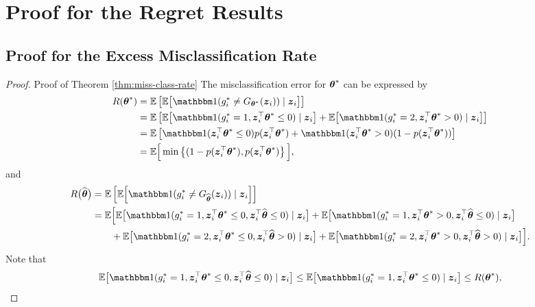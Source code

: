 

\section{Proof for the Regret Results}
\label{sec:proof-regret}

\subsection{Proof for the Excess Misclassification Rate}\label{sec:proof-misclustering}

\begin{proof}{Proof of Theorem \ref{thm:miss-class-rate}}
The misclassification error for $\boldsymbol{\theta}^*$ can be expressed by
\begin{align*}
	R(\btheta^*) & = \EE\brackets{\EE\big[\bbone(g_i^* \neq G_{\btheta^*}(\bz_i)) \cond \bz_i\big]} \\
	&=\EE\brackets{\EE\big[\bbone(g_i^* =1, \bz_i^{\top}\btheta^*\leq0) \cond \bz_i\big]+\EE\big[\bbone(g_i^* =2, \bz_i^{\top}\btheta^*>0) \cond \bz_i\big]} \\
	&=\EE\brackets{\bbone(\bz_i^{\top}\btheta^* \leq 0)p(\bz_i^{\top}\btheta^*)+\bbone(\bz_i^{\top}\btheta^* > 0)(1-p(\bz_i^{\top}\btheta^*))} \\
	& = \EE \Big[\min\braces{(1 - p(\bz_i^\top\btheta^*), p(\bz_i^\top\btheta^*)}\Big],
\end{align*}
and 
\begin{align*}
	R\big(\hat\btheta\big) & = \EE\brackets{\EE\Big[\bbone(g_i^* \neq G_{\hat\btheta}(\bz_i)) \cond \bz_i\Big]}\\
	&=\EE\Big[\EE\big[\bbone(g_i^* =1, \bz_i^{\top}\btheta^*\leq0, \bz_i^{\top}\hat{\btheta} \leq 0) \cond \bz_i\big]+\EE\big[\bbone(g_i^* =1, \bz_i^{\top}\btheta^*>0, \bz_i^{\top}\hat{\btheta} \leq 0) \cond \bz_i\big]\\
	&\quad\quad +\EE\big[\bbone(g_i^* =2, \bz_i^{\top}\btheta^*\leq0, \bz_i^{\top}\hat{\btheta} >0) \cond \bz_i\big]+\EE\big[\bbone(g_i^* =2, \bz_i^{\top}\btheta^*>0, \bz_i^{\top}\hat{\btheta} > 0) \cond \bz_i\big]\Big] . %
\end{align*}
Note that
\[\EE\big[\bbone(g_i^* =1, \bz_i^{\top}\btheta^*\leq0, \bz_i^{\top}\hat{\btheta} \leq 0) \cond \bz_i\big] \leq \EE\big[\bbone(g_i^* =1, \bz_i^{\top}\btheta^*\leq0) \cond \bz_i\big] \leq R(\btheta^*),\]

\end{proof}
